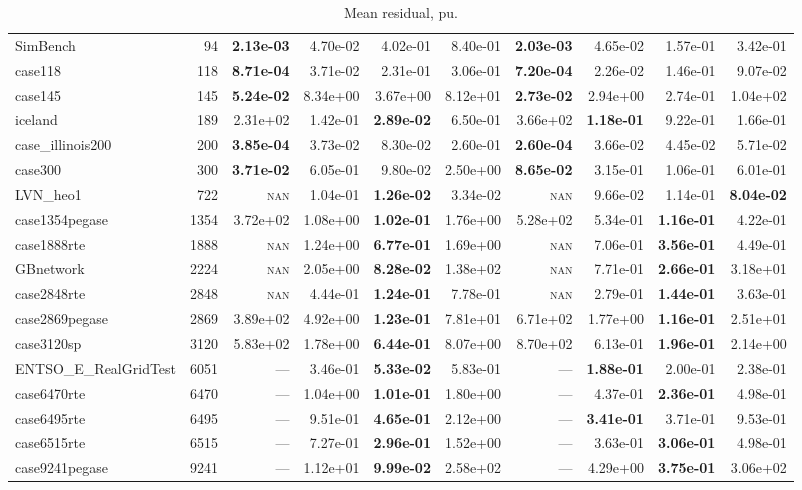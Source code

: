 \documentclass[10pt]{article}
\begin{document}
\begin{table}[H]
\begin{tabular}{lr rrrr rrrr}
SimBench & 94 & \textbf{2.13e-03} & 4.70e-02 & 4.02e-01 & 8.40e-01 & \textbf{2.03e-03} & 4.65e-02 & 1.57e-01 & 3.42e-01 \\
case118 & 118 & \textbf{8.71e-04} & 3.71e-02 & 2.31e-01 & 3.06e-01 & \textbf{7.20e-04} & 2.26e-02 & 1.46e-01 & 9.07e-02 \\
case145 & 145 & \textbf{5.24e-02} & 8.34e+00 & 3.67e+00 & 8.12e+01 & \textbf{2.73e-02} & 2.94e+00 & 2.74e-01 & 1.04e+02 \\
iceland & 189 & 2.31e+02 & 1.42e-01 & \textbf{2.89e-02} & 6.50e-01 & 3.66e+02 & \textbf{1.18e-01} & 9.22e-01 & 1.66e-01 \\
case\_illinois200 & 200 & \textbf{3.85e-04} & 3.73e-02 & 8.30e-02 & 2.60e-01 & \textbf{2.60e-04} & 3.66e-02 & 4.45e-02 & 5.71e-02 \\
case300 & 300 & \textbf{3.71e-02} & 6.05e-01 & 9.80e-02 & 2.50e+00 & \textbf{8.65e-02} & 3.15e-01 & 1.06e-01 & 6.01e-01 \\
LVN\_heo1 & 722 & \textsc{nan} & 1.04e-01 & \textbf{1.26e-02} & 3.34e-02 & \textsc{nan} & 9.66e-02 & 1.14e-01 & \textbf{8.04e-02} \\
case1354pegase & 1354 & 3.72e+02 & 1.08e+00 & \textbf{1.02e-01} & 1.76e+00 & 5.28e+02 & 5.34e-01 & \textbf{1.16e-01} & 4.22e-01 \\
case1888rte & 1888 & \textsc{nan} & 1.24e+00 & \textbf{6.77e-01} & 1.69e+00 & \textsc{nan} & 7.06e-01 & \textbf{3.56e-01} & 4.49e-01 \\
GBnetwork & 2224 & \textsc{nan} & 2.05e+00 & \textbf{8.28e-02} & 1.38e+02 & \textsc{nan} & 7.71e-01 & \textbf{2.66e-01} & 3.18e+01 \\
case2848rte & 2848 & \textsc{nan} & 4.44e-01 & \textbf{1.24e-01} & 7.78e-01 & \textsc{nan} & 2.79e-01 & \textbf{1.44e-01} & 3.63e-01 \\
case2869pegase & 2869 & 3.89e+02 & 4.92e+00 & \textbf{1.23e-01} & 7.81e+01 & 6.71e+02 & 1.77e+00 & \textbf{1.16e-01} & 2.51e+01 \\
case3120sp & 3120 & 5.83e+02 & 1.78e+00 & \textbf{6.44e-01} & 8.07e+00 & 8.70e+02 & 6.13e-01 & \textbf{1.96e-01} & 2.14e+00 \\
ENTSO\_E\_RealGridTest & 6051 & --- & 3.46e-01 & \textbf{5.33e-02} & 5.83e-01 & --- & \textbf{1.88e-01} & 2.00e-01 & 2.38e-01 \\
case6470rte & 6470 & --- & 1.04e+00 & \textbf{1.01e-01} & 1.80e+00 & --- & 4.37e-01 & \textbf{2.36e-01} & 4.98e-01 \\
case6495rte & 6495 & --- & 9.51e-01 & \textbf{4.65e-01} & 2.12e+00 & --- & \textbf{3.41e-01} & 3.71e-01 & 9.53e-01 \\
case6515rte & 6515 & --- & 7.27e-01 & \textbf{2.96e-01} & 1.52e+00 & --- & 3.63e-01 & \textbf{3.06e-01} & 4.98e-01 \\
case9241pegase & 9241 & --- & 1.12e+01 & \textbf{9.99e-02} & 2.58e+02 & --- & 4.29e+00 & \textbf{3.75e-01} & 3.06e+02 \\
\bottomrule
\end{tabular}
\caption{Mean residual, pu.}
\end{table}
\end{document}
